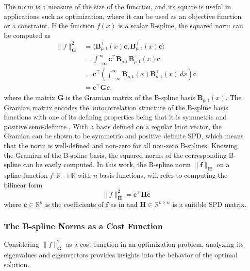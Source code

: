 The norm is a measure of the size of the function, and its square is useful in applications such as optimization, where it can be used as an objective function or a constraint. If the function $f(x)$ is a scalar B-spline, the squared norm can be computed as
\begin{equation}
    \label{eq:norm-spline}
    \begin{aligned}
        \|f\|_\mathbf G^2 &= \langle\mathbf B_{p, \mathbf t}^\top(x) \mathbf c, \mathbf B_{p, \mathbf t}^\top(x) \mathbf c\rangle \\
        &= \int_{-\infty}^\infty \mathbf c^\top \mathbf B_{p, \mathbf t}\mathbf B_{p, \mathbf t}^\top(x) \mathbf c \\
        &= \mathbf c^\top \left(\int_{-\infty}^\infty \mathbf B_{p, \mathbf t}(x) \mathbf B_{p, \mathbf t}^\top(x) \, dx\right) \mathbf c \\
        &= \mathbf c^\top \mathbf G \mathbf c,
\end{aligned}
\end{equation}
where the matrix $\mathbf G$ is the Gramian matrix of the B-spline basis $\mathbf B_{p, \mathbf t}(x)$. The Gramian matrix encodes the autocorrelation  structure of the B-spline basis functions with one of its defining properties being that it is symmetric and positive semi-definite \citep{horn2013positive}. With a basis defined on a regular knot vector, the Gramian can be shown to be symmetric and positive definite \acrshort{SPD}, which means that the norm is well-defined and non-zero for all non-zero B-splines.  Knowing the Gramian of the B-spline basis, the squared norms of the corresponding B-spline can be easily computed. In this work, the B-spline norm $\|\mathbf f\|_\mathbf H$ on a spline function $f: \mathbb R\to\mathbb R$ with $n$ basis functions, will refer to computing the bilinear form
\begin{equation}\label{eq:b-spline-norm}
    \|f\|_\mathbf H^2 = \mathbf{c}^\top \mathbf H \mathbf {c}
\end{equation}
where $\mathbf{c}\in\mathbb R^{n}$ is the coefficients of $\mathbf f$ as in and $\mathbf H\in\mathbb R^{n\times n}$ is a suitible SPD matrix. 



\subsubsection{The B-spline Norms as a Cost Function}\label{sec:b-spline-norms-as-cost-functions}
Considering $\|f\|_\mathbf G^2$ as a cost function in an optimization problem, analyzing its eigenvalues and eigenvectors provides insights into the behavior of the optimal solution.


